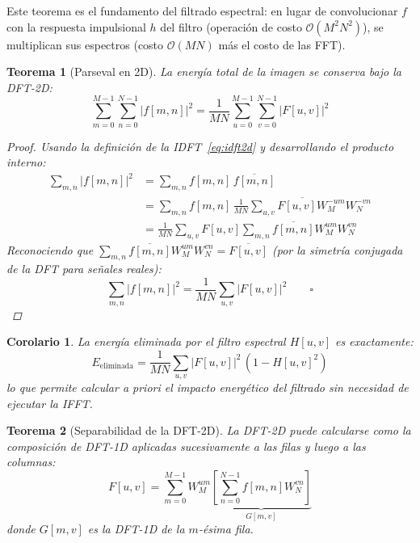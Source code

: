 \documentclass[conference]{IEEEtran}
\newtheorem{teorema}{Teorema}
\newtheorem{corolario}{Corolario}
\begin{document}
Este teorema es el fundamento del filtrado espectral: en lugar de convolucionar
$f$ con la respuesta impulsional $h$ del filtro (operación de costo
$\mathcal{O}(M^2N^2)$), se multiplican sus espectros (costo $\mathcal{O}(MN)$
más el costo de las FFT).

\begin{teorema}[Parseval en 2D]
  \label{teo:parseval}
  La energía total de la imagen se conserva bajo la DFT-2D:
  \begin{equation}
    \sum_{m=0}^{M-1}\sum_{n=0}^{N-1}|f[m,n]|^2
    = \frac{1}{MN}\sum_{u=0}^{M-1}\sum_{v=0}^{N-1}|F[u,v]|^2
    \label{eq:parseval2d}
  \end{equation}
  \begin{proof}
    Usando la definición de la IDFT~\eqref{eq:idft2d} y desarrollando el
    producto interno:
    \begin{align*}
      \sum_{m,n}|f[m,n]|^2 &= \sum_{m,n} f[m,n]\,\overline{f[m,n]} \\
      &= \sum_{m,n} f[m,n]\,\overline{\frac{1}{MN}\sum_{u,v}F[u,v]W_M^{-um}W_N^{-vn}} \\
      &= \frac{1}{MN}\sum_{u,v}F[u,v]\sum_{m,n}\overline{f[m,n]}W_M^{um}W_N^{vn}
    \end{align*}
    Reconociendo que $\sum_{m,n}\overline{f[m,n]}W_M^{um}W_N^{vn} = \overline{F[u,v]}$
    (por la simetría conjugada de la DFT para señales reales):
    \begin{equation*}
      \sum_{m,n}|f[m,n]|^2 = \frac{1}{MN}\sum_{u,v}|F[u,v]|^2 \qquad \square
    \end{equation*}
  \end{proof}
\end{teorema}

\begin{corolario}
  La energía eliminada por el filtro espectral $H[u,v]$ es exactamente:
  \begin{equation}
    E_{\text{eliminada}} = \frac{1}{MN}\sum_{u,v}|F[u,v]|^2\,(1-H[u,v]^2)
    \label{eq:energia_eliminada}
  \end{equation}
  lo que permite calcular a priori el impacto energético del filtrado
  sin necesidad de ejecutar la IFFT.
\end{corolario}

\begin{teorema}[Separabilidad de la DFT-2D]
  \label{teo:sep}
  La DFT-2D puede calcularse como la composición de DFT-1D aplicadas
  sucesivamente a las filas y luego a las columnas:
  \begin{equation}
    F[u,v] = \sum_{m=0}^{M-1}W_M^{um}
             \underbrace{\left[\sum_{n=0}^{N-1}f[m,n]W_N^{vn}\right]}_{G[m,v]}
    \label{eq:separabilidad}
  \end{equation}
  donde $G[m,v]$ es la DFT-1D de la $m$-ésima fila.
\end{teorema}
\end{document}
